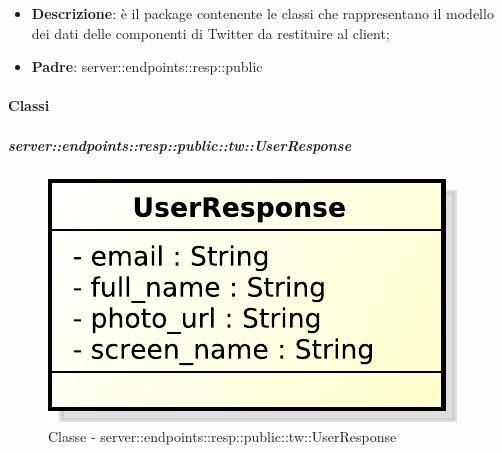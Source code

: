 \begin{itemize}
  \item \textbf{Descrizione}: è il package contenente le classi che rappresentano il modello dei dati delle componenti di Twitter da restituire al client;
  \item \textbf{Padre}: server::endpoints::resp::public
\end{itemize}

  \paragraph{Classi} %

    \subparagraph{server::endpoints::resp::public::tw::UserResponse} %
    \label{subp:bdsm_app_server_endpoints_resp_public_tw_userresponse}
  \begin{figure}[!htbp]
    \centering
    \centerline{\includegraphics[scale=0.6]{./images/server/classes/endpoints/tw/user_response.pdf}}
    \caption{Classe - server::endpoints::resp::public::tw::UserResponse}
  \end{figure}
